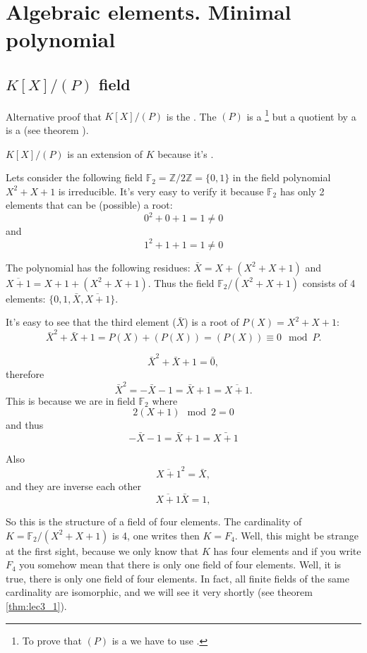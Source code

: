 \section{Algebraic elements. Minimal polynomial}

\subsection{$K\left[X\right]/\left(P\right)$ field}

Alternative proof that $K\left[X\right]/\left(P\right)$ is the
. The $\left(P\right)$ is a 
\footnote{
  To prove that $\left(P\right)$ is a  we have
  to use .
}
but a quotient by a   is a 
(see theorem ).

$K\left[X\right]/\left(P\right)$ is an extension of $K$ because it's
.

\begin{example}[$K = \mathbb{F}_2/\left(X^2+X+1\right)$]
  Lets consider the following field
  $\mathbb{F}_2 = \mathbb{Z}/2\mathbb{Z} = \{0,1\}$ in the
  field polynomial $X^2+X+1$ is irreducible. It's very easy to verify
  it because $\mathbb{F}_2$ has only 2 elements that can be (possible)
  a root:
  \[
  0^2+0+1 = 1\ne 0
  \]
  and
  \[
  1^2+1+1 = 1\ne 0
  \]
  
  The polynomial has the following
  residues: $\bar{X} = X + \left(X^2+X+1\right)$ and
  $\overline{X + 1} = X + 1 + \left(X^2+X+1\right)$. Thus the field
  $\mathbb{F}_2/\left(X^2+X+1\right)$ consists of 4 elements:
  $\{0, 1, \bar{X}, \overline{X+1}\}$.

  It's easy to see that the third element ($\bar{X}$) is a root of
  $P(X) = X^2+X+1$:
  \[
  \bar{X}^2 + \bar{X} + 1 =
  P(X) + \left(P(X)\right) = \left(P(X)\right) \equiv 0 \mod P.
  \]
  
  \[
  \bar{X}^2 + \bar{X} + 1 = \bar{0},
  \]
  therefore 
  \[
  \bar{X}^2 = - \bar{X} - 1 = \bar{X} + 1 = \overline{X+1}.
  \]
  This is because we are in field $\mathbb{F}_2$ where
  \[
  2 \left(X + 1\right) \mod 2 = 0 
  \]
  and thus
  \[
  - \bar{X} - 1 = \bar{X} + 1 = \bar{X + 1}
  \]
  
  Also
  \[
  \overline{X+1}^2 = \bar{X},
  \]
  and they are inverse each other
  \[
  \overline{X+1} \bar{X} = 1,
  \]

  So this is the structure of a field of four elements.  The
  cardinality of $K=\mathbb{F}_2/\left(X^2+X+1\right)$ is 4,  one
  writes then $K=F_4$. Well, this might be 
  strange at the first sight, because we only know that $K$ has four
  elements and if you write $F_4$  you somehow mean that there is only
  one field of four elements. Well, it is true, there is only one
  field of four elements. In fact, all finite fields of the same
  cardinality are isomorphic, and we will see it very shortly
  (see theorem \ref{thm:lec3_1}).  
  \label{ex:F2overP}
\end{example}


